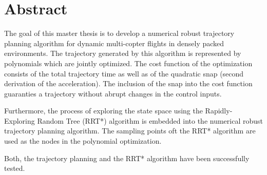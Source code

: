 




 \setcounter{tocdepth}{2}
 \tableofcontents

 \cleardoublepage







\chapter*{Abstract}

The goal of this master thesis is to develop a numerical robust trajectory planning algorithm for dynamic multi-copter flights in densely packed environments. The trajectory generated by this algorithm is represented by polynomials which are jointly optimized. The cost function of the optimization consists of the total trajectory time as well as of the quadratic snap (second derivation of the acceleration). The inclusion of the snap into the cost function guaranties a trajectory without abrupt changes in the control inputs. \newline

Furthermore, the process of exploring the state space using the Rapidly-Exploring Random Tree (RRT*) algorithm is embedded into the numerical robust trajectory planning algorithm. The sampling points oft the RRT* algorithm are used as the nodes in the polynomial optimization.\newline

Both, the trajectory planning and the RRT* algorithm have been successfully tested.


